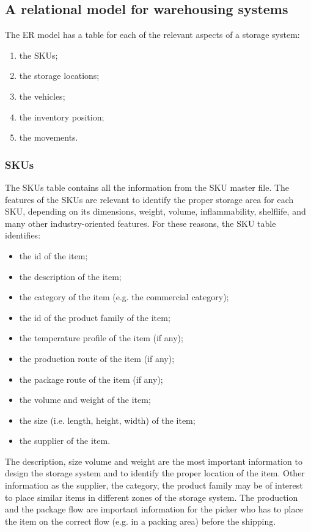 \subsection{A relational model for warehousing systems}
The ER model has a table for each of the relevant aspects of a storage system:
\begin{enumerate}
    \item the SKUs;
    \item the storage locations;
    \item the vehicles;
    \item the inventory position;
    \item the movements.
\end{enumerate}

\subsubsection{SKUs}
The SKUs table contains all the information from the SKU master file. The features of the SKUs are relevant to identify the proper storage area for each SKU, depending on its dimensions, weight, volume, inflammability, shelflife, and many other industry-oriented features. For these reasons, the SKU table identifies:

\begin{itemize}
    \item the id of the item;
    \item the description of the item;
    \item the category of the item (e.g. the commercial category);
    \item the id of the product family of the item;
    \item the temperature profile of the item (if any);
    \item the production route of the item (if any);
    \item the package route of the item (if any);
    \item the volume and weight of the item;
    \item the size (i.e. length, height, width) of the item;
    \item the supplier of the item.

\end{itemize}

The description, size volume and weight are the most important information to design the storage system and to identify the proper location of the item. Other information as the supplier, the category, the product family may be of interest to place similar items in different zones of the storage system. The production and the package flow are important information for the picker who has to place the item on the correct flow (e.g. in a packing area) before the shipping.

